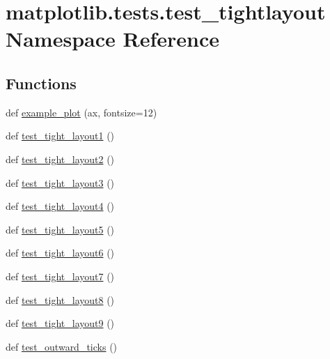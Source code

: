 \hypertarget{namespacematplotlib_1_1tests_1_1test__tightlayout}{}\section{matplotlib.\+tests.\+test\+\_\+tightlayout Namespace Reference}
\label{namespacematplotlib_1_1tests_1_1test__tightlayout}
\subsection*{Functions}
\begin{DoxyCompactItemize}
\item 
def \hyperlink{namespacematplotlib_1_1tests_1_1test__tightlayout_a2b799eeec203f46f732c5486537a2166}{example\+\_\+plot} (ax, fontsize=12)
\item 
def \hyperlink{namespacematplotlib_1_1tests_1_1test__tightlayout_abbf9096610a2d5c7ec339db3d6bfce50}{test\+\_\+tight\+\_\+layout1} ()
\item 
def \hyperlink{namespacematplotlib_1_1tests_1_1test__tightlayout_aa36083159d7e49df9573ed8e66e9d2e6}{test\+\_\+tight\+\_\+layout2} ()
\item 
def \hyperlink{namespacematplotlib_1_1tests_1_1test__tightlayout_af231556a18583b093495e6d43414de52}{test\+\_\+tight\+\_\+layout3} ()
\item 
def \hyperlink{namespacematplotlib_1_1tests_1_1test__tightlayout_a2c92066ec7f4fff19e5fc7ebf3862909}{test\+\_\+tight\+\_\+layout4} ()
\item 
def \hyperlink{namespacematplotlib_1_1tests_1_1test__tightlayout_ad1cd04b63e1aea22983c1b71d8736b08}{test\+\_\+tight\+\_\+layout5} ()
\item 
def \hyperlink{namespacematplotlib_1_1tests_1_1test__tightlayout_a11ce95d42b1b63650a50dde284b69f83}{test\+\_\+tight\+\_\+layout6} ()
\item 
def \hyperlink{namespacematplotlib_1_1tests_1_1test__tightlayout_ad276942ad1447960ee29d82f561c6ab4}{test\+\_\+tight\+\_\+layout7} ()
\item 
def \hyperlink{namespacematplotlib_1_1tests_1_1test__tightlayout_a4c947ea8dadd7c7231edd6c8b10530f6}{test\+\_\+tight\+\_\+layout8} ()
\item 
def \hyperlink{namespacematplotlib_1_1tests_1_1test__tightlayout_a627719a56cb259f37f4a50a1530261f9}{test\+\_\+tight\+\_\+layout9} ()
\item 
def \hyperlink{namespacematplotlib_1_1tests_1_1test__tightlayout_a2eae775dfe52961f8d650a11bf26a76f}{test\+\_\+outward\+\_\+ticks} ()

\end{DoxyCompactItemize}
